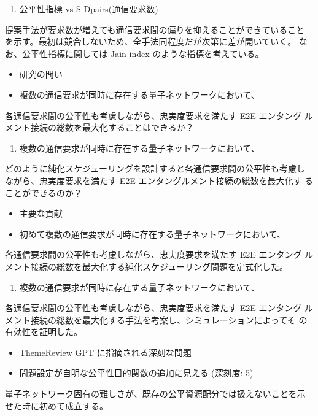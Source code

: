 \documentclass[conference]{IEEEtran}
\begin{document}
\begin{enumerate}
\item 公平性指標 vs S-Dpairs(通信要求数)
\end{enumerate}

提案手法が要求数が増えても通信要求間の偏りを抑えることができていること
を示す。最初は競合しないため、全手法同程度だが次第に差が開いていく。
なお、公平性指標に関しては Jain index のような指標を考えている。


\begin{itemize}
\item 研究の問い

\item 複数の通信要求が同時に存在する量子ネットワークにおいて、
\end{itemize}
各通信要求間の公平性も考慮しながら、忠実度要求を満たす E2E エンタング
ルメント接続の総数を最大化することはできるか？

\begin{enumerate}
\item 複数の通信要求が同時に存在する量子ネットワークにおいて、
\end{enumerate}
どのように純化スケジューリングを設計すると各通信要求間の公平性も考慮し
ながら、忠実度要求を満たす E2E エンタングルメント接続の総数を最大化す
ることができるのか？


\begin{itemize}
\item 主要な貢献

\item 初めて複数の通信要求が同時に存在する量子ネットワークにおいて、
\end{itemize}
各通信要求間の公平性も考慮しながら、忠実度要求を満たす E2E エンタング
ルメント接続の総数を最大化する純化スケジューリング問題を定式化した。

\begin{enumerate}
\item 複数の通信要求が同時に存在する量子ネットワークにおいて、
\end{enumerate}
各通信要求間の公平性も考慮しながら、忠実度要求を満たす E2E エンタング
ルメント接続の総数を最大化する手法を考案し、シミュレーションによってそ
の有効性を証明した。


\begin{itemize}
\item ThemeReview GPT に指摘される深刻な問題
\item 問題設定が自明な公平性目的関数の追加に見える (深刻度: 5)
\end{itemize}
量子ネットワーク固有の難しさが、既存の公平資源配分では扱えないことを示
せた時に初めて成立する。
\end{document}
